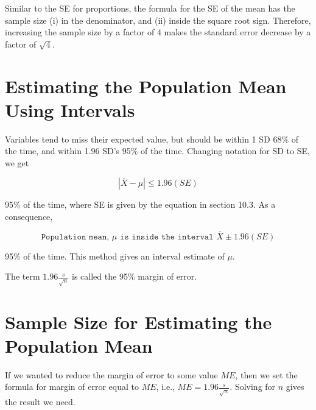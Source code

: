 \documentclass[11pt]{book}\usepackage[]{graphicx}\usepackage[]{color}
\begin{document}
Similar to the SE for proportions, the formula for the SE of the mean has the sample size (i) in the denominator, and (ii) inside the square root sign.  Therefore, increasing the sample size by a factor of 4 makes the standard error decrease by a factor of $\sqrt{4}$. 


\section{Estimating the Population Mean Using Intervals}

Variables tend to miss their expected value, but should be within 1 SD 68\% of the time, and within 1.96 SD's 95\% of the time. Changing notation for SD to SE, we get

\begin{equation*}
| \bar{X} - \mu | \le 1.96 (SE) 
\end{equation*}

95\% of the time, where SE is given by the equation in section 10.3.  As a consequence,

\begin{equation*}
\texttt{Population mean, } \mu \texttt{ is inside the interval } \bar{X} \pm 1.96 (SE) 
\end{equation*}

95\% of the time.  This method gives an interval estimate of $\mu$. 

\vspace{2mm}


\vspace{2mm}

The term $1.96 \frac{s}{\sqrt{n}}$ is called the 95\% margin of error.

\section{Sample Size for Estimating the Population Mean}

If we wanted to reduce the margin of error to some value $ME$, then we set the formula for margin of error equal to $ME$, i.e., $ME = 1.96 \frac{s}{\sqrt{n}}$.  Solving for $n$ gives the result we need.  
\end{document}
